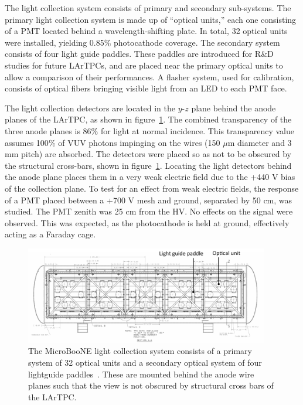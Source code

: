 The light collection system consists of primary and secondary sub-systems.  The primary light collection system is made up of ``optical units,'' each one consisting of a PMT located behind a wavelength-shifting plate.  In total, 32 optical units were installed, yielding 0.85\% photocathode coverage.  The secondary system consists of four light guide paddles.   These paddles are introduced for R\&D studies for future LArTPCs, and are placed near the primary optical units to allow a comparison of their performances.  A flasher system, used for calibration, consists of optical fibers bringing visible light from an LED to each PMT face.

The light collection detectors are located in the $y$-$z$ plane behind the anode planes of the LArTPC, as shown in figure~\ref{fig:lightlayout}.  The combined transparency of the three anode planes is 86\% for light at normal incidence.  This transparency value assumes 100$\%$ of VUV photons impinging on the wires (150 $\mu$m diameter and 3 mm pitch) are absorbed.  The detectors were placed so as not to be obscured by the \lartpc structural cross-bars, shown in figure~\ref{fig:lightlayout}.  Locating the light detectors behind the anode plane places them in a very weak electric field due to the +440 V bias of the collection plane.  To test for an effect from weak electric fields, the response of a PMT placed between a +700 V mesh and ground, separated by 50 cm, was studied.  The PMT zenith was 25 cm from the HV.   No effects on the signal were observed.  This was expected, as the photocathode is held at ground, effectively acting as a Faraday cage.  
\begin{figure}
	\centering
              \includegraphics[width=0.95\textwidth]{./figures/PMTPlacement.pdf} 
        \caption{The MicroBooNE light collection system consists of a primary system of 32 optical units and a secondary optical system of four lightguide paddles~\cite{Katori:2013wqa}. These are mounted behind the anode wire planes such that the view is not obscured by structural cross bars of the LArTPC. }\label{fig:lightlayout}
\end{figure}


